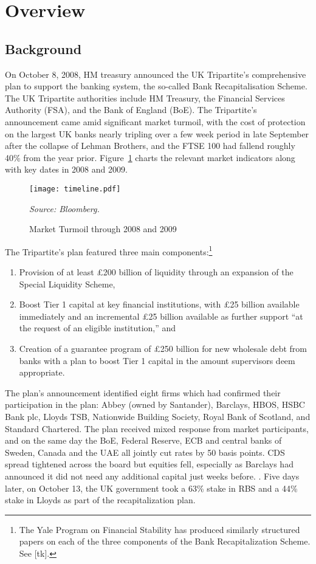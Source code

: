 \documentclass[12pt]{article}
\begin{document}
\section{Overview}

\subsection{Background}

On October 8, 2008, HM treasury announced the UK Tripartite's comprehensive plan to support the banking system, the so-called Bank Recapitalisation Scheme. The UK Tripartite authorities include HM Treasury, the Financial Services Authority (FSA), and the Bank of England (BoE). The Tripartite's announcement came amid significant market turmoil, with the cost of protection on the largest UK banks nearly tripling over a few week period in late September after the collapse of Lehman Brothers, and the FTSE 100 had fallend roughly 40\% from the year prior. Figure~\ref{timeline} charts the relevant market indicators along with key dates in 2008 and 2009.

\begin{figure}[h]
\caption{Market Turmoil through 2008 and 2009}\label{timeline}
\centering
\texttt{[image: timeline.pdf]}
\raggedright
\textit{\footnotesize Source: Bloomberg.}
\end{figure}

The Tripartite's plan featured three main components:\footnote{The Yale Program on Financial Stability has produced similarly structured papers on each of the three components of the Bank Recapitalization Scheme. See [tk].}

\begin{enumerate}
\item Provision of at least \pounds 200 billion of liquidity through an expansion of the Special Liquidity Scheme,
\item Boost Tier 1 capital at key financial institutions, with \pounds 25 billion available immediately and an incremental \pounds 25 billion available as further support ``at the request of an eligible institution,'' and
\item Creation of a guarantee program of \pounds 250 billion for new wholesale debt from banks with a plan to boost Tier 1 capital in the amount supervisors deem appropriate.
\end{enumerate}

The plan's announcement identified eight firms which had confirmed their participation in the plan: Abbey (owned by Santander), Barclays, HBOS, HSBC Bank plc, Lloyds TSB, Nationwide Building Society, Royal Bank of Scotland, and Standard Chartered. The plan received mixed response from market participants, and on the same day the BoE, Federal Reserve, ECB and central banks of Sweden, Canada and the UAE all jointly cut rates by 50 basis points. CDS spread tightened across the board but equities fell, especially as Barclays had announced it did not need any additional capital just weeks before. \citep{BRSAnnouncement}. Five days later, on October 13, the UK government took a 63\% stake in RBS and a 44\% stake in Lloyds as part of the recapitalization plan.
\end{document}
